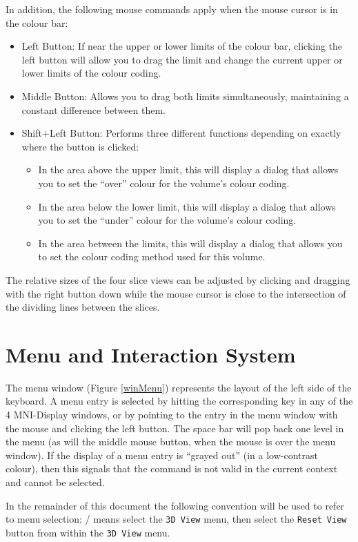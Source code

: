 \documentclass[11pt,letterpaper]{article}
\newcommand{\ident}[1]{{\tt #1}}
\newcommand{\display}{\mbox{MNI-Display}}
\newcommand{\menutwo}[2]{{\scriptsize \fbox{\bf #1}/\fbox{\bf #2}}}
\begin{document}
In addition, the following mouse commands apply when the mouse cursor is in the colour bar:
\begin{itemize}
\item Left Button: If near the upper or lower limits of the colour bar,
clicking the left button will allow you to drag the limit and change the
current upper or lower limits of the colour coding.
\item Middle Button: Allows you to drag both limits simultaneously, maintaining a 
constant difference between them.
\item Shift+Left Button: Performs three different functions depending on
exactly where the button is clicked:
\begin{itemize}
\item In the area above the upper limit,
 this will display a dialog that allows you to set the ``over'' colour
 for the volume's colour coding.
\item In the area below the lower limit,
 this will display a dialog that allows you to set the ``under'' colour
 for the volume's colour coding.
\item In the area between the limits, this will display a dialog that
allows you to set the colour coding method used for this volume.
\end{itemize}
\end{itemize}

The relative sizes of the four slice views can be adjusted by clicking
and dragging with the right button down while the mouse cursor is
close to the intersection of the dividing lines between the slices.

\section{Menu and Interaction System}

The menu window (Figure \ref{winMenu}) represents the
layout of the left side of the keyboard.  A menu entry is selected by
hitting the corresponding key in any of the 4 \display{} windows, or
by pointing to the entry in the menu window with the mouse and
clicking the left button. The space bar will pop back one level in the
menu (as will the middle mouse button, when the mouse is over the menu
window). If the display of a menu entry is ``grayed out'' (in a
low-contrast colour), then this signals that the command is not valid
in the current context and cannot be selected.

In the remainder of this document the following convention will be
used to refer to menu selection: \menutwo{3D View}{Reset View} means
select the \ident{3D View} menu, then select the \ident{Reset View}
button from within the \ident{3D View} menu.
\end{document}
